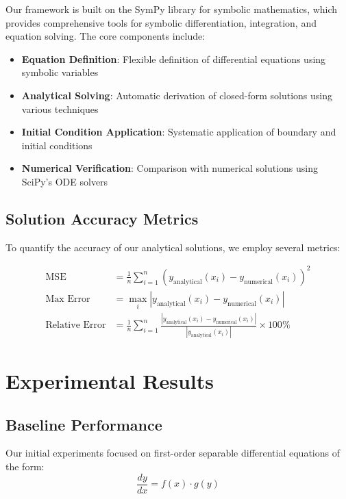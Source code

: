 \documentclass{article} %
\begin{document}
Our framework is built on the SymPy library for symbolic mathematics, which provides comprehensive tools for symbolic differentiation, integration, and equation solving. The core components include:

\begin{itemize}
\item \textbf{Equation Definition}: Flexible definition of differential equations using symbolic variables
\item \textbf{Analytical Solving}: Automatic derivation of closed-form solutions using various techniques
\item \textbf{Initial Condition Application}: Systematic application of boundary and initial conditions
\item \textbf{Numerical Verification}: Comparison with numerical solutions using SciPy's ODE solvers
\end{itemize}

\subsection{Solution Accuracy Metrics}

To quantify the accuracy of our analytical solutions, we employ several metrics:

\begin{align}
\text{MSE} &= \frac{1}{n} \sum_{i=1}^{n} (y_{\text{analytical}}(x_i) - y_{\text{numerical}}(x_i))^2 \\
\text{Max Error} &= \max_i |y_{\text{analytical}}(x_i) - y_{\text{numerical}}(x_i)| \\
\text{Relative Error} &= \frac{1}{n} \sum_{i=1}^{n} \frac{|y_{\text{analytical}}(x_i) - y_{\text{numerical}}(x_i)|}{|y_{\text{analytical}}(x_i)|} \times 100\%
\end{align}

\section{Experimental Results}

\subsection{Baseline Performance}

Our initial experiments focused on first-order separable differential equations of the form:
\begin{equation}
\frac{dy}{dx} = f(x) \cdot g(y)
\end{equation}
\end{document}

